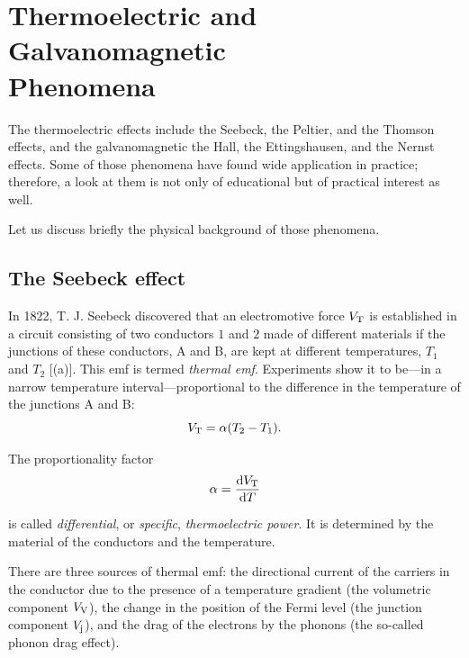 

\chapter[Thermoelectric and Galvanomagnetic
Phenomena]{Thermoelectric and Galvanomagnetic\\
Phenomena}\label{chap:9}

The thermoelectric effects include the Seebeck, the Peltier, and the Thomson effects, and the galvanomagnetic the Hall, the Ettingshausen, and the Nernst effects. Some of those phenomena have found wide application in practice; therefore, a look at them is not only of educational but of practical interest as well.

Let us discuss briefly the physical background of those phenomena.

\section{The Seebeck effect}\label{sec:79}

In 1822, T. J. Seebeck discovered that an electromotive force $V_{\text{T}}$ is established in a circuit consisting of two conductors $1$ and $2$ made of different materials if the junctions of these conductors, A and B, are kept at different temperatures, $T_1$ and $T_2$ [(a)]. This emf is termed \textit{thermal emf}. Experiments show it to be---in a narrow temperature interval---proportional to the difference in the temperature of the junctions A and B:
\begin{equation}\label{eq:9_1}
    V_{\text{T}} = \alpha (T_2 - T_1).
\end{equation}

The proportionality factor
\begin{equation}\label{eq:9_2}
    \alpha = \dfrac{\mathrm{d}V_{\text{T}}}{\mathrm{d} T}
\end{equation}

\noindent
is called \textit{differential}, or \textit{specific}, \textit{thermoelectric power}. It is determined by the material of the conductors and the temperature.

There are three sources of thermal emf: the directional current of the carriers in the conductor due to the presence of a temperature gradient (the volumetric component $V_{\text{V}}$), the change in the position of the Fermi level (the junction component $V_{\text{j}}$), and the drag of the electrons by the phonons (the so-called phonon drag effect).

